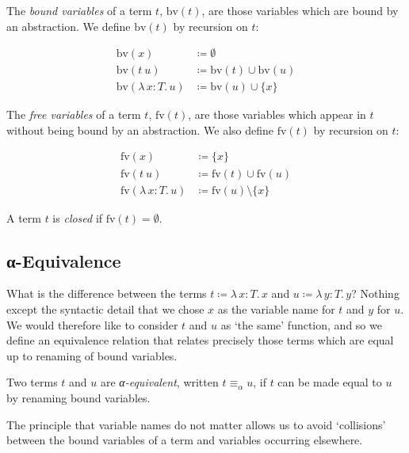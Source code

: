 \documentclass{article}
\theoremstyle{definition}
\newcommand{\bv}{\mathrm{bv}}
\newcommand{\fv}{\mathrm{fv}}
\newcommand{\Lam}[2]{λ\,#1.\, #2}
\begin{document}
\begin{definition}
  The \emph{bound variables} of a term $t$, $\bv(t)$, are those variables which are bound by an abstraction.
  We define $\bv(t)$ by recursion on $t$:

  \begin{align*}
    \bv(x) &\coloneqq ∅ \\
    \bv(t~u) &\coloneqq \bv(t) ∪ \bv(u) \\
    \bv(\Lam{x : T}{u}) &\coloneqq \bv(u) ∪ \{x\}
  \end{align*}
\end{definition}

\begin{definition}
  The \emph{free variables} of a term $t$, $\fv(t)$, are those variables which appear in $t$ without being bound by an abstraction.
  We also define $\fv(t)$ by recursion on $t$:

  \begin{align*}
    \fv(x) &\coloneqq \{x\} \\
    \fv(t~u) &\coloneqq \fv(t) ∪ \fv(u) \\
    \fv(\Lam{x : T}{u}) &\coloneqq \fv(u) \setminus \{x\}
  \end{align*}

  A term $t$ is \emph{closed} if $\fv(t) = ∅$.
\end{definition}

\subsection{α-Equivalence}

What is the difference between the terms $t ≔ \Lam{x : T}{x}$ and $u ≔ \Lam{y : T}{y}$?
Nothing except the syntactic detail that we chose $x$ as the variable name for $t$ and $y$ for $u$.
We would therefore like to consider $t$ and $u$ as \enquote*{the same} function, and so we define an equivalence relation that relates precisely those terms which are equal up to renaming of bound variables.

\begin{definition}[α-equivalence]
  Two terms $t$ and $u$ are \emph{α-equivalent}, written $t ≡_{α} u$, if $t$ can be made equal to $u$ by renaming bound variables.
\end{definition}

The principle that variable names do not matter allows us to avoid \enquote*{collisions} between the bound variables of a term and variables occurring elsewhere.
\end{document}
